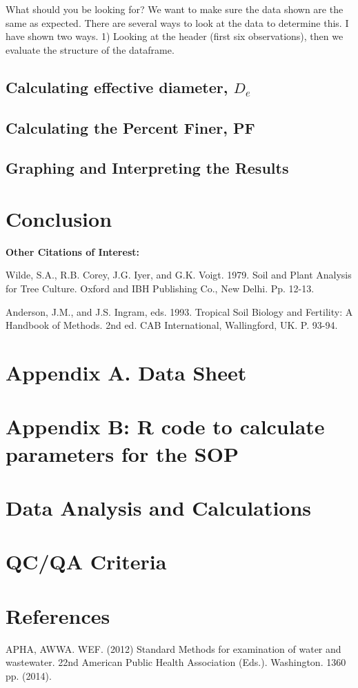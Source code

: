 \documentclass[12pt]{../SOP3_alpha}
\begin{document}
What should you be looking for?  We want to make sure the data shown are the same as expected. There are several ways to look at the data to determine this. I have shown two ways. 1) Looking at the header (first six observations), then we evaluate the structure of the dataframe.
 
\subsection{Calculating effective diameter, $D_e$}


\subsection{Calculating the Percent Finer, PF}


\subsection{Graphing and Interpreting the Results}

\section{Conclusion}

% 

% 

\medskip
\noindent \textbf{Other Citations of Interest:} 

Wilde, S.A., R.B. Corey, J.G. Iyer, and G.K. Voigt.  1979.  Soil and Plant Analysis for Tree Culture.  Oxford and IBH Publishing Co., New Delhi.  Pp. 12-13.

Anderson, J.M., and J.S. Ingram, eds.  1993.  Tropical Soil Biology and Fertility:  A Handbook of Methods. 2nd ed.  CAB International, Wallingford, UK.  P. 93-94.

\newpage
\thispagestyle{empty}

\section{Appendix A. Data Sheet}




\newpage
\section{Appendix B: R code to calculate parameters for the SOP}

% 		

\section{Data Analysis and Calculations}

\section{QC/QA Criteria}

\section{References}

\NP APHA, AWWA. WEF. (2012) Standard Methods for examination of water and wastewater. 22nd American Public Health Association (Eds.). Washington. 1360 pp. (2014).
\end{document}
